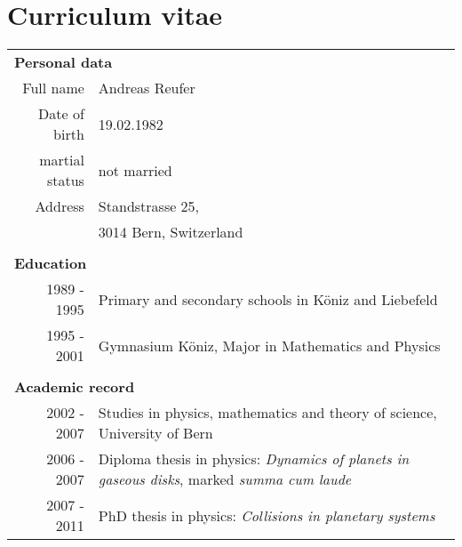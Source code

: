 \cleardoublepage


\chapter*{Curriculum vitae}

\begin{tabular}{r p{12.0cm}}
\multicolumn{2}{l}{ {\large \bf Personal data} } \\
Full name & Andreas Reufer\\
Date of birth & 19.02.1982\\
martial status & not married \\
Address & Standstrasse 25, \\
 & 3014 Bern, Switzerland \\
\\
\multicolumn{2}{l}{ {\large \bf Education} } \\
1989 - 1995 & Primary and secondary schools in Köniz and Liebefeld\\
1995 - 2001 & Gymnasium Köniz, Major in Mathematics and Physics\\
\\
\multicolumn{2}{l}{ {\large \bf Academic record} } \\
2002 - 2007 & Studies in physics, mathematics and theory of science, University of Bern \\
2006 - 2007 & Diploma thesis in physics: \emph{Dynamics of planets in gaseous disks}, marked \emph{summa cum laude} \\
2007 - 2011 & PhD thesis in physics: \emph{Collisions in planetary systems} \\
\end{tabular}

